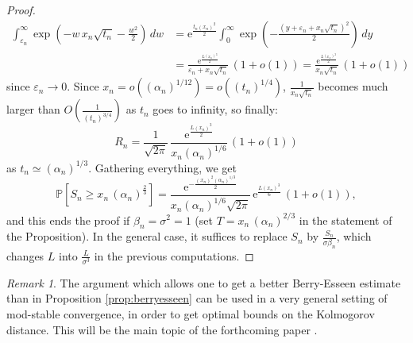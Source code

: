\documentclass[12pt,a4paper,reqno]{amsart}
\theoremstyle{remark}
\newtheorem{remark}[lemma]{Remark}
\newcommand{\E}{\mathrm{e}}
\newcommand{\proba}{\mathbb{P}}
\newcommand{\eps}{\varepsilon}
\newcommand{\alphan}{\alpha_n}
\begin{document}
\begin{proof}
\begin{align*}
\int_{\eps_n}^{\infty} \exp\left(-w\,x_n\sqrt{t_n}-\frac{w^2}{2} \right)\,dw &= \E^{\frac{t_n(x_n)^2}{2}}\int_{0}^{\infty} \exp\left(-\frac{(y+\eps_n+x_n\sqrt{t_n})^2}{2} \right)\,dy\\
&= \frac{\E^{\frac{L(x_n)^3}{2}}}{\eps_n+x_n\sqrt{t_n}}\, (1+o(1)) = \frac{\E^{\frac{L(x_n)^3}{2}}}{x_n\sqrt{t_n}} \,(1+o(1))
\end{align*}
since $\eps_n \to 0$. Since $x_n=o((\alphan)^{1/12}) = o((t_n)^{1/4})$, $\frac{1}{x_n\sqrt{t_n}}$ becomes much larger than $O(\frac{1}{(t_n)^{3/4}})$ as $t_n$ goes to infinity, so finally:
$$R_n = \frac{1}{\sqrt{2\pi}}\,\frac{\E^{\frac{L(x_n)^3}{2}}}{x_n(\alphan)^{1/6}} \,(1+o(1))$$
as $t_n\simeq (\alphan)^{1/3}$. Gathering everything, we get
$$\proba\!\left[S_{n} \geq x_{n}\,(\alphan)^{\frac{2}{3}}\right] = \frac{\E^{-\frac{(x_n)^2(\alphan)^{1/3}}{2}}}{x_n(\alphan)^{1/6}\sqrt{2\pi}}\,\E^{\frac{L(x_n)^3}{6}}\,(1+o(1)),$$
and this ends the proof if $\beta_n=\sigma^2=1$ (set $T=x_n\,(\alphan)^{2/3}$ in the statement of the Proposition). In the general case, it suffices to replace $S_n$ by $\frac{S_{n}}{\sigma\beta_n}$, which changes $L$ into $\frac{L}{\sigma^3}$ in the previous computations.
\end{proof}
\medskip

\begin{remark}
The argument which allows one to get a better Berry-Esseen estimate than in Proposition \ref{prop:berryesseen} can be used in a very general setting of mod-stable convergence, in order to get optimal bounds on the Kolmogorov distance. This will be the main topic of the forthcoming paper \cite{FMN14}.
\end{remark}
\bigskip
\end{document}
